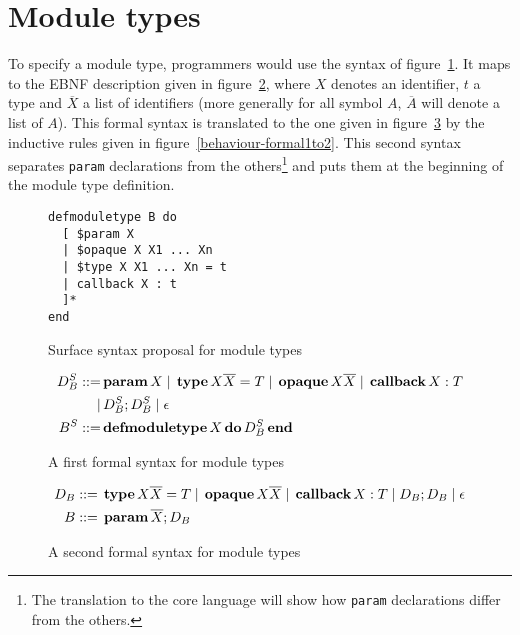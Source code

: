 \documentclass[a4paper,10pt]{article}
\author{Aghilas Y. Boussaa}
\newcommand{\kw}[1]{%
  \,\text{\textbf{#1}}\,
}
\newcommand{\pipe}{%
\; | \;
}
\begin{document}
\section{Module types}
To specify a module type, programmers would use the syntax of
figure~\ref{behaviour-surface}. It maps to the EBNF description given in
figure~\ref{behaviour-formal1}, where $X$ denotes an identifier, $t$ a type and
$\overline{X}$ a list of identifiers (more generally for all symbol $A$,
$\overline{A}$ will denote a list of $A$). This formal syntax is translated to
the one given in figure~\ref{behaviour-formal2} by the inductive rules given in
figure~\ref{behaviour-formal1to2}. This second syntax separates \texttt{param}
declarations from the others\footnote{The translation to the core language will
show how \texttt{param} declarations differ from the others.} and puts them at
the beginning of the module type definition.
\begin{figure}[h]
\begin{verbatim}
defmoduletype B do
  [ $param X
  | $opaque X X1 ... Xn
  | $type X X1 ... Xn = t
  | callback X : t
  ]*
end
\end{verbatim}
\caption{Surface syntax proposal for module types}\label{behaviour-surface}
\end{figure}
\begin{figure}[h]
  \begin{align*}D_B^S ::=& \kw{param} X \pipe \kw{type} X \overline{X} = T
    \pipe \kw{opaque} X \overline{X} \pipe \kw{callback} X:T \\
    |&\, D_B^S ; D_B^S \pipe \epsilon \\
    B^S ::=& \kw{defmoduletype} X \kw{do} D_B^S \kw{end}
  \end{align*}
  \caption{A first formal syntax for module types}\label{behaviour-formal1}
\end{figure}
\begin{figure}[h]
  \begin{align*}D_B &::= \kw{type} X \overline{X} = T \pipe \kw{opaque} X
  \overline{X} \pipe \kw{callback} X:T \pipe D_B ; D_B \pipe \epsilon \\
  B &::= \kw{param} \overline{X}; D_B
  \end{align*}
  \caption{A second formal syntax for module types}\label{behaviour-formal2}
\end{figure}
\end{document}
